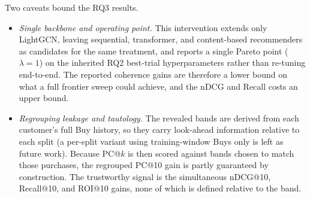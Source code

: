 Two caveats bound the RQ3 results.

\begin{itemize}
    \item \textit{Single backbone and operating point.} This intervention extends only LightGCN, leaving sequential, transformer, and content-based recommenders as candidates for the same treatment, and reports a single Pareto point ($\lambda = 1$) on the inherited RQ2 best-trial hyperparameters rather than re-tuning end-to-end. The reported coherence gains are therefore a lower bound on what a full frontier sweep could achieve, and the nDCG and Recall costs an upper bound.
    \item \textit{Regrouping leakage and tautology.} The revealed bands are derived from each customer's full Buy history, so they carry look-ahead information relative to each split (a per-split variant using training-window Buys only is left as future work). Because PC@$k$ is then scored against bands chosen to match those purchases, the regrouped PC@10 gain is partly guaranteed by construction. The trustworthy signal is the simultaneous nDCG@10, Recall@10, and ROI@10 gains, none of which is defined relative to the band.
\end{itemize}
